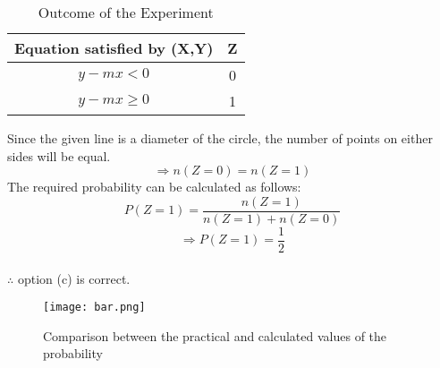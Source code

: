 \documentclass[journal,12pt,twocolumn]{IEEEtran}
\begin{document}
\begin{table}[h]
\centering
    \begin{tabular}{|c|c|}
        \hline
        Equation satisfied by (X,Y)& Z    \\\hline
        $y-mx<0$ & 0    \\\hline
        $y-mx\geq0$ & 1 \\\hline
    \end{tabular}
\caption{Outcome of the Experiment}
\label{table=1}
\end{table}

Since the given line is a diameter of the circle, the number of points on either sides will be equal.
\begin{equation}
    \Rightarrow n(Z=0) = n(Z=1)
\end{equation}
The required probability can be calculated as follows:
\begin{equation}
    P(Z=1) = \frac{n(Z=1)}{n(Z=1)+n(Z=0)}
\end{equation}
\begin{equation}
    \Rightarrow P(Z=1) = \frac{1}{2}
\end{equation}
\\ $\therefore$ option (c) is correct.

\begin{figure}[!htb]
\centering
\texttt{[image: bar.png]}
\label{}
\caption{Comparison between the practical and calculated values of the probability}
\end{figure}
\end{document}
